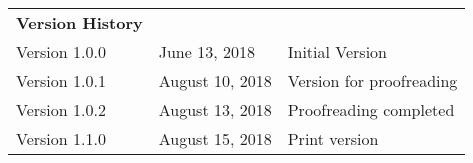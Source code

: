 \begin{small}
    \vspace{3em}
    \begin{tabular}{>{\ttfamily}llp{88mm}}
        \textbf{Version History} \\[1ex]
        Version 1.0.0 & June 13, 2018 & Initial Version\\
        Version 1.0.1 & August 10, 2018 & Version for proofreading\\
        Version 1.0.2 & August 13, 2018 & Proofreading completed\\
        Version 1.1.0 & August 15, 2018 & Print version\\
    \end{tabular}
\end{small}